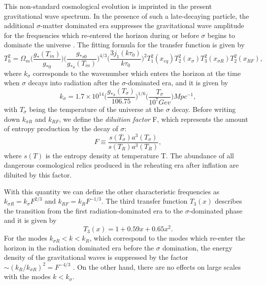 \documentclass[11pt,a4paper,twoside]{book}
\begin{document}
This non-standard cosmological evolution is imprinted in the present gravitational wave spectrum. In the presence of such a late-decaying particle, the additional $\sigma$-matter dominated era suppresses the gravitational wave amplitude for the frequencies which re-entered the horizon during or before $\sigma$ begins to dominate the universe \cite{Chap3:ProibingReheatingTemperature2008}. The fitting formula for the transfer function is given by \cite{Chap3:ProibingReheatingTemperature2008}
\begin{equation}
	\label{Chap3:TransferFunctionLateEntropy}
	T^{2}_{h} = \Omega_{m}\Bigg(\frac{g_{*}(T_{in})}{g_{*0}}\Bigg)\Bigg(\frac{g_{*s0}}{g_{*s}(T_{in})}\Bigg)^{4/3}\Bigg (\frac{3j_{1}(k\tau_{0})}{k\tau_{0}}\Bigg)^{2}T_{1}^{2}(x_{eq})T_{2}^{2}(x_{\sigma})T_{3}^{2}(x_{\sigma R})T^{2}_{2}(x_{RF}),
\end{equation}
where $ k_{\sigma} $ corresponds to the wavenumber which enters the horizon at the time  when $\sigma$ decays into radiation after the $\sigma$-dominated era, and it is given by
\begin{equation}
\label{Chap3:kSigma}
k_{\sigma} = 1.7 \times 10^{14} \Bigg (\frac{g_{*s}(T_{\sigma})}{106.75}\Bigg)^{1/6}\Bigg (\frac{T_{\sigma}}{10^{7} Gev}\Bigg) Mpc^{-1},
\end{equation}
with $ T_{\sigma} $ being the temperature of the universe at the $\sigma$ decay. Before writing down $ k_{\sigma R} $ and $ k_{RF} $, we define the \textit{diluition factor} F, which represents the amount of entropy production by the decay of $\sigma$:
\begin{equation}
	\label{Chap3:DiluitionFactor}
	F \equiv \frac{s(T_{\sigma})a^{3}(T_{\sigma})}{s(T_{R})a^{3}(T_{R})},
\end{equation}
where $ s(T) $ is the entropy density at temperature T. The abundance of all dangerous cosmological relics produced in the reheating era after inflation are diluited by this factor.

With this quantity  we can define the other characteristic frequencies as $ k_{\sigma R}=k_{\sigma}F^{2/3} $ and $ k_{RF}=k_{R}F^{-1/3} $. The third transfer function $ T_{3}(x) $ describes the transition from the first radiation-dominated era to the $\sigma$-dominated phase and it is given by \cite{Chap3:ProibingReheatingTemperature2008}
\begin{equation}
	\label{Chap3:ThirdTransferFunction}
	T_{3}(x) = 1 + 0.59x + 0.65x^{2}.
\end{equation}
For the modes $ k_{\sigma R} < k < k_{R}$, which correspond to the modes which re-enter the horizon in the radiation dominated era before the $\sigma$ domination, the energy density of the gravitational waves is suppressed by the factor $\sim (k_{R}/k_{\sigma R})^{2} = F^{-4/3}$ \cite{Chap3:Seto_Yokohama}. On the other hand, there are no effects on large scales with the modes $ k < k_{\sigma} $.
\end{document}
